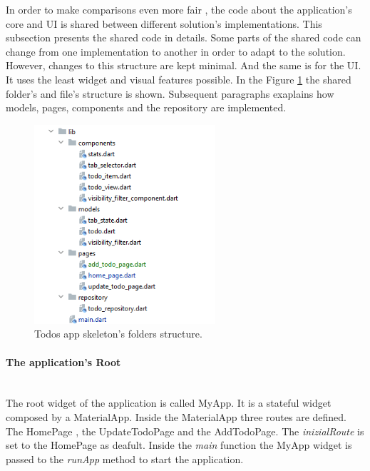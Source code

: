 In order to make comparisons even more fair , the code about the application's core and UI is shared between different solution's implementations. This subsection presents the shared code in details. Some parts of the shared code can change from one implementation to another in order to adapt to the solution. However, changes to this structure are kept minimal. And the same is for the UI. It uses the least widget and visual features possible. In the Figure \ref{fig:todo_app_shared_folder_structure} the shared folder's and file's structure is shown. Subsequent paragraphs exaplains how models, pages, components and the repository are implemented. 

		
		\begin{figure}[H]
		    \centering
		    \includegraphics[width=0.6\textwidth]{Images/folder_structure.png}
		    \caption{Todos app skeleton's folders structure.}
		    \label{fig:todo_app_shared_folder_structure}
		\end{figure}
		
		
		
		\paragraph{The application's Root} \mbox{} \\
		\label{par:todo_app_root}
The root widget of the application is called MyApp.
It is a stateful widget composed by a MaterialApp. Inside the MaterialApp three routes are defined. The HomePage , the UpdateTodoPage and the AddTodoPage. The \textit{inizialRoute} is set to the HomePage as deafult. Inside the \textit{main} function the MyApp widget is passed to the \textit{runApp} method to start the application.
		

